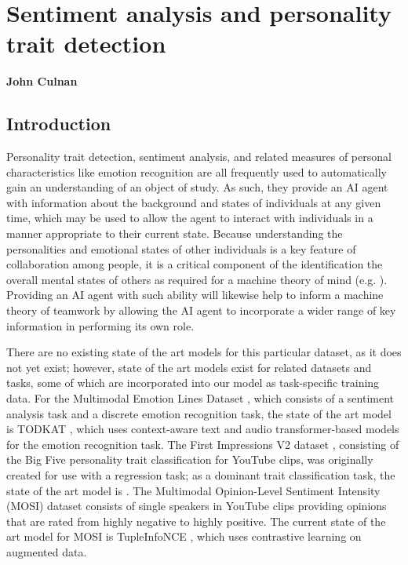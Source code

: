 \chapter{Sentiment analysis and personality trait detection}
\textbf{John Culnan}
\section{Introduction}

Personality trait detection, sentiment analysis, and related measures of
personal characteristics like emotion recognition are all frequently used to
automatically gain an understanding of an object of study. As such, they
provide an AI agent with information about the background and states of
individuals at any given time, which may be used to allow the agent to interact
with individuals in a manner appropriate to their current state. Because
understanding the personalities and emotional states of other individuals is a
key feature of collaboration among people, it is a critical component of the
identification the overall mental states of others as required for a machine
theory of mind (e.g. \citet{Rabinowitz.ea:2018}). Providing an AI agent with
such ability will likewise help to inform a machine theory of teamwork by
allowing the AI agent to incorporate a wider range of key information in
performing its own role. 

There are no existing state of the art models for this particular dataset, as
it does not yet exist; however, state of the art models exist for related
datasets and tasks, some of which are incorporated into our model as
task-specific training data. For the Multimodal Emotion Lines Dataset
\citep{Poria.ea:2019}, which consists of a sentiment analysis task and a discrete
emotion recognition task, the state of the art model is TODKAT
\citep{Zhu.ea:2021}, which uses context-aware text and audio
transformer-based models for the emotion recognition task. The First
Impressions V2 dataset \citep{Ponce-Lopez.ea:2016}, consisting of the Big Five
personality trait classification for YouTube clips, was originally created for
use with a regression task; as a dominant trait classification task, the state
of the art model is \citet{Culnan.ea:2021}. The Multimodal Opinion-Level
Sentiment Intensity (MOSI) dataset \citep{Zadeh.ea:2016} consists of single
speakers in YouTube clips providing opinions that are rated from highly
negative to highly positive. The current state of the art model for MOSI is
TupleInfoNCE \citep{Liu.ea:2021}, which uses contrastive learning on
augmented data. 

